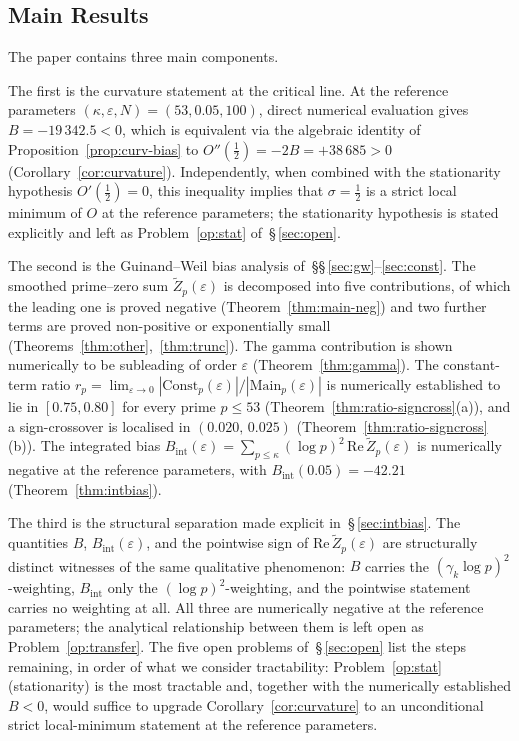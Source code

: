 \documentclass[11pt]{article}
\newcommand{\Zt}{\widetilde{Z}}
\begin{document}
\subsection{Main Results}

The paper contains three main components.

The first is the curvature statement at the critical line.
At the reference parameters $(\kappa,\varepsilon,N)=(53,0.05,100)$,
direct numerical evaluation gives $B=-19\,342.5<0$, which is equivalent
via the algebraic identity of Proposition~\ref{prop:curv-bias} to
$O''(\tfrac12)=-2B=+38\,685>0$
(Corollary~\ref{cor:curvature}).
Independently, when combined with the stationarity hypothesis
$O'(\tfrac12)=0$, this inequality implies that $\sigma=\tfrac12$ is a
strict local minimum of $O$ at the reference parameters; the
stationarity hypothesis is stated explicitly and left as
Problem~\ref{op:stat} of~\S\,\ref{sec:open}.

The second is the Guinand--Weil bias analysis of~\S\S\,\ref{sec:gw}--\ref{sec:const}.
The smoothed prime--zero sum $\Zt_p(\varepsilon)$ is decomposed into
five contributions, of which the leading one is proved negative
(Theorem~\ref{thm:main-neg}) and two further terms are proved
non-positive or exponentially small
(Theorems~\ref{thm:other},~\ref{thm:trunc}).
The gamma contribution is shown numerically to be subleading of order
$\varepsilon$ (Theorem~\ref{thm:gamma}).
The constant-term ratio $r_p=\lim_{\varepsilon\to 0}
|\mathrm{Const}_p(\varepsilon)|/|\mathrm{Main}_p(\varepsilon)|$
is numerically established to lie in $[0.75,0.80]$ for every prime
$p\le 53$ (Theorem~\ref{thm:ratio-signcross}(a)), and a sign-crossover
is localised in $(0.020,\,0.025)$
(Theorem~\ref{thm:ratio-signcross}(b)).
The integrated bias
$B_{\mathrm{int}}(\varepsilon)=\sum_{p\le\kappa}(\log p)^2\,
\mathrm{Re}\,\Zt_p(\varepsilon)$ is numerically negative at the
reference parameters, with $B_{\mathrm{int}}(0.05)=-42.21$
(Theorem~\ref{thm:intbias}).

The third is the structural separation made explicit in~\S\,\ref{sec:intbias}.
The quantities $B$, $B_{\mathrm{int}}(\varepsilon)$, and the pointwise
sign of $\mathrm{Re}\,\Zt_p(\varepsilon)$ are structurally distinct
witnesses of the same qualitative phenomenon: $B$ carries the
$(\gamma_k\log p)^2$-weighting, $B_{\mathrm{int}}$ only the
$(\log p)^2$-weighting, and the pointwise statement carries no
weighting at all.
All three are numerically negative at the reference parameters; the
analytical relationship between them is left open as
Problem~\ref{op:transfer}.
The five open problems of~\S\,\ref{sec:open} list the steps remaining,
in order of what we consider tractability:
Problem~\ref{op:stat} (stationarity) is the most tractable and, together
with the numerically established $B<0$, would suffice to upgrade
Corollary~\ref{cor:curvature} to an unconditional strict local-minimum
statement at the reference parameters.
\end{document}
